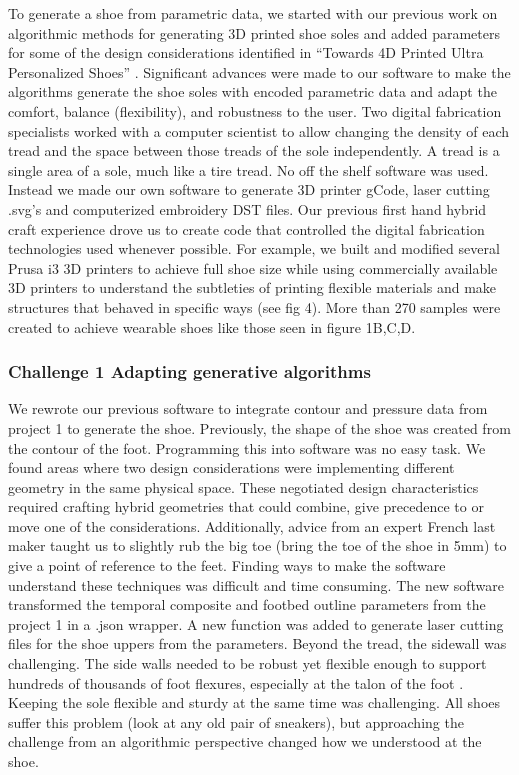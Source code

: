To generate a shoe from parametric data, we started with our previous work on algorithmic methods for generating 3D printed shoe soles \cite{Feijs2016} and added parameters for some of the design considerations identified in ``Towards 4D Printed Ultra Personalized Shoes'' \cite{nachtigall2018towards}. Significant advances were made to our software \cite{Feijs2015} to make the algorithms generate the shoe soles with encoded parametric data and adapt the comfort, balance (flexibility), and robustness to the user. Two digital fabrication specialists worked with a computer scientist to allow changing the density of each  tread and the space between those treads of the sole independently. A tread is a single area of a sole, much like a tire tread.
No off the shelf software was used. Instead we made our own software to generate 3D printer gCode, laser cutting .svg's and computerized embroidery DST files. Our previous first hand hybrid craft experience drove us to create code \cite{Feijs2016} that controlled the digital fabrication technologies used whenever possible. For example, we built and modified several Prusa i3 3D printers to achieve full shoe size while using commercially available 3D printers to understand the subtleties of printing flexible materials and make structures that behaved in specific ways (see fig 4). More than 270 samples were created to achieve wearable shoes like those seen in figure 1B,C,D. 


\subsubsection{Challenge 1 Adapting generative algorithms}

We rewrote our previous software \cite{Feijs2015} to integrate contour and pressure data from project 1 to generate the shoe. Previously, the shape of the shoe was created from the contour of the foot. Programming this into software was no easy task. We found areas where two design considerations were implementing different geometry in the same physical space. These negotiated design characteristics required crafting hybrid geometries that could combine, give precedence to or move one of the considerations. Additionally, advice from an expert French last maker taught us to slightly rub the big toe (bring the toe of the shoe in 5mm) to give a point of reference to the feet. Finding ways to make the software understand these techniques was difficult and time consuming.  
The new software transformed the temporal composite and footbed outline parameters from the project 1 in a .json wrapper. A new function was added to generate laser cutting files for the shoe uppers from the parameters. Beyond the tread,  the sidewall was challenging. The side walls needed to be robust yet flexible enough to support hundreds of thousands of foot flexures, especially at the talon of the foot . Keeping the sole flexible and sturdy at the same time was challenging. All shoes suffer this problem (look at any old pair of sneakers), but approaching the challenge from an algorithmic perspective changed how we  understood at the shoe. 


